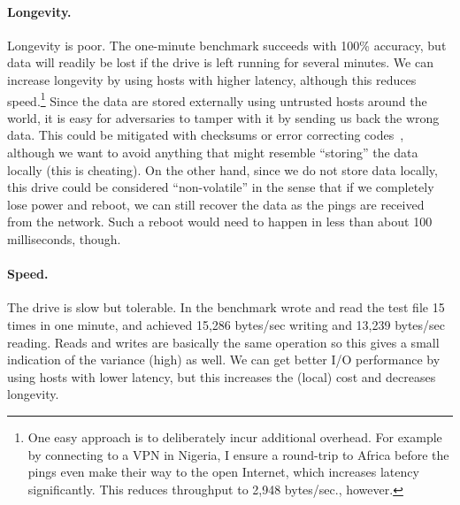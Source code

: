 \documentclass[twocolumn]{article}
\begin{document}
\paragraph{Longevity.} Longevity is poor. The one-minute benchmark
succeeds with 100\% accuracy, but data will readily be lost if the
drive is left running for several minutes. We can increase longevity
by using hosts with higher latency, although this reduces
speed.\!\footnote{ One easy approach is to deliberately incur
  additional overhead. For example by connecting to a VPN in Nigeria,
  I ensure a round-trip to Africa before the pings even make their way
  to the open Internet, which increases latency significantly. This
  reduces throughput to 2,948 bytes/sec., however.} Since the data are
stored externally using untrusted hosts around the world, it is easy
for adversaries to tamper with it by sending us back the wrong data.
This could be mitigated with checksums or error correcting
codes~\cite{reed1960polynomial}, although we want to avoid anything
that might resemble ``storing'' the data locally (this is cheating).
On the other hand, since we do not store data locally, this drive
could be considered ``non-volatile'' in the sense that if we
completely lose power and reboot, we can still recover the data as the
pings are received from the network. Such a reboot would need to
happen in less than about 100 milliseconds, though.

\paragraph{Speed.} The drive is slow but tolerable. In the benchmark
wrote and read the test file 15 times in one minute, and achieved
15,286 bytes/sec writing and 13,239 bytes/sec reading. Reads and
writes are basically the same operation so this gives a small
indication of the variance (high) as well. We can get better I/O
performance by using hosts with lower latency, but this increases the
(local) cost and decreases longevity.
\end{document}
